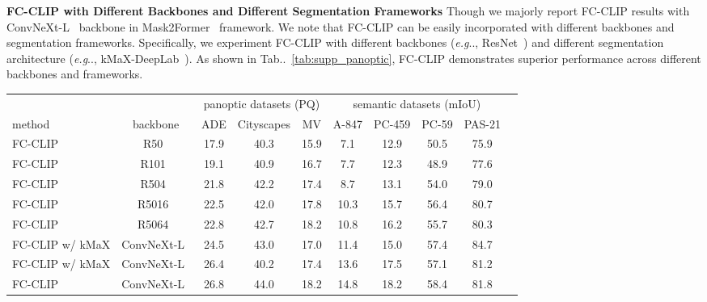 \documentclass{article}
\makeatletter
\DeclareRobustCommand\onedot{\futurelet\@let@token\@onedot}
\def\@onedot{\ifx\@let@token.\else.\null\fi\xspace}
\def\eg{\emph{e.g}\onedot}
\newcommand{\tabref}[1]{Tab\onedot~\ref{#1}}
\newcommand{\modelname}{FC-CLIP\xspace}
\newcommand{\tablestyle}[2]{\setlength{\tabcolsep}{#1}\renewcommand{\arraystretch}{#2}\centering\footnotesize}
\makeatother
\begin{document}
\noindent \textbf{\modelname with Different Backbones and Different Segmentation Frameworks}\quad
Though we majorly report \modelname results with ConvNeXt-L~\cite{liu2022convnet,radford2021learning} backbone in Mask2Former~\cite{cheng2021masked} framework. We note that \modelname can be easily incorporated with different backbones and segmentation frameworks. Specifically, we experiment \modelname with different backbones (\eg, ResNet~\cite{he2016deep}) and different segmentation architecture (\eg, kMaX-DeepLab~\cite{yu2022k}). As shown in \tabref{tab:supp_panoptic}, \modelname demonstrates superior performance across different backbones and frameworks.

\begin{table*}[!t]
\small
\centering
\tablestyle{4pt}{1.05}
\caption{
    \label{tab:supp_panoptic}
    \textbf{Open-vocabulary segmentation performance with different backbones and segmentation frameworks.} All models are trained on COCO and tested on the other datasets in a zero-shot manner. MV: Mapillary Vistas. : kMaX-DeepLab with multi-scale deformable attention~\cite{zhu2020deformable}
}
\begin{tabular}{l|c|ccc|ccccc}
                           & \multicolumn{1}{c|}{} & \multicolumn{3}{c|}{panoptic datasets (PQ)}   & \multicolumn{4}{c}{semantic datasets (mIoU)}                                \\
method      & backbone                & ADE            & Cityscapes   & MV   & A-847 & PC-459 & PC-59 & PAS-21             \\
\shline
\modelname & R50~\cite{he2016deep,radford2021learning}   & 17.9 & 40.3 & 15.9  & 7.1 & 12.9 & 50.5 & 75.9 \\
\modelname & R101~\cite{he2016deep,radford2021learning}   & 19.1 & 40.9 & 16.7  & 7.7 & 12.3 & 48.9 & 77.6 \\
\modelname & R504~\cite{radford2021learning}    & 21.8 & 42.2 & 17.4  & 8.7 & 13.1 & 54.0 & 79.0 \\
\modelname & R5016~\cite{radford2021learning}    & 22.5 & 42.0 & 17.8  & 10.3 & 15.7 & 56.4 & 80.7 \\
\modelname  & R5064~\cite{radford2021learning}   & 22.8 & 42.7 & 18.2  & 10.8 & 16.2 & 55.7 & 80.3  \\
\hline 
\modelname w/ kMaX & ConvNeXt-L~\cite{liu2022convnet,ilharco_gabriel_2021_5143773}    & 24.5 & 43.0 & 17.0 & 11.4 & 15.0 & 57.4 & 84.7 \\
\modelname w/ kMaX & ConvNeXt-L~\cite{liu2022convnet,ilharco_gabriel_2021_5143773}  & 26.4 & 40.2 & 17.4 & 13.6  & 17.5 & 57.1  & 81.2 \\
\hline 
\modelname & ConvNeXt-L~\cite{liu2022convnet,ilharco_gabriel_2021_5143773}   & 26.8 & 44.0 & 18.2  & 14.8 & 18.2 & 58.4 & 81.8 \\

\end{tabular}
\end{table*}
\end{document}
